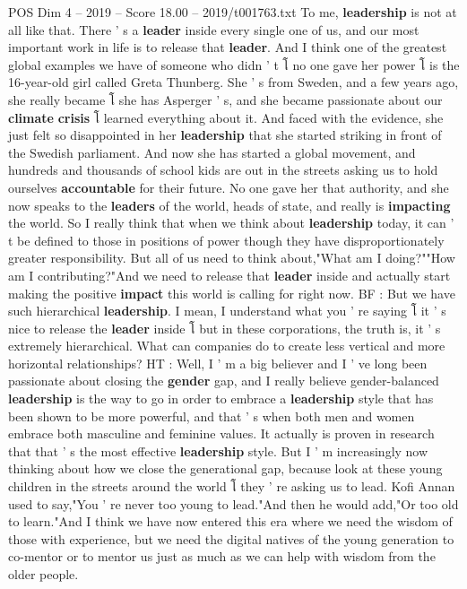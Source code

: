\begin{textsample}{POS Dim 4 – 2019 – Score 18.00 – 2019/t001763.txt}
To me, \textbf{leadership} is not at all like that.
There ' s a \textbf{leader} inside every single one of us, and our most important work in life is to release that \textbf{leader}.
And I think one of the greatest global examples we have of someone who didn ' t โ no one gave her power โ is the 16-year-old girl called Greta Thunberg.
She ' s from Sweden, and a few years ago, she really became โ she has Asperger ' s, and she became passionate about our \textbf{climate} \textbf{crisis} โ learned everything about it.
And faced with the evidence, she just felt so disappointed in her \textbf{leadership} that she started striking in front of the Swedish parliament.
And now she has started a global movement, and hundreds and thousands of school kids are out in the streets asking us to hold ourselves \textbf{accountable} for their future.
No one gave her that authority, and she now speaks to the \textbf{leaders} of the world, heads of state, and really is \textbf{impacting} the world.
So I really think that when we think about \textbf{leadership} today, it can ' t be defined to those in positions of power though they have disproportionately greater responsibility.
But all of us need to think about,"What am I doing?""How am I contributing?"And we need to release that \textbf{leader} inside and actually start making the positive \textbf{impact} this world is calling for right now.
BF : But we have such hierarchical \textbf{leadership}.
I mean, I understand what you ' re saying โ it ' s nice to release the \textbf{leader} inside โ but in these corporations, the truth is, it ' s extremely hierarchical.
What can companies do to create less vertical and more horizontal relationships?
HT : Well, I ' m a big believer and I ' ve long been passionate about closing the \textbf{gender} gap, and I really believe gender-balanced \textbf{leadership} is the way to go in order to embrace a \textbf{leadership} style that has been shown to be more powerful, and that ' s when both men and women embrace both masculine and feminine values.
It actually is proven in research that that ' s the most effective \textbf{leadership} style.
But I ' m increasingly now thinking about how we close the generational gap, because look at these young children in the streets around the world โ they ' re asking us to lead.
Kofi Annan used to say,"You ' re never too young to lead."And then he would add,"Or too old to learn."And I think we have now entered this era where we need the wisdom of those with experience, but we need the digital natives of the young generation to co-mentor or to mentor us just as much as we can help with wisdom from the older people.

\end{textsample}
